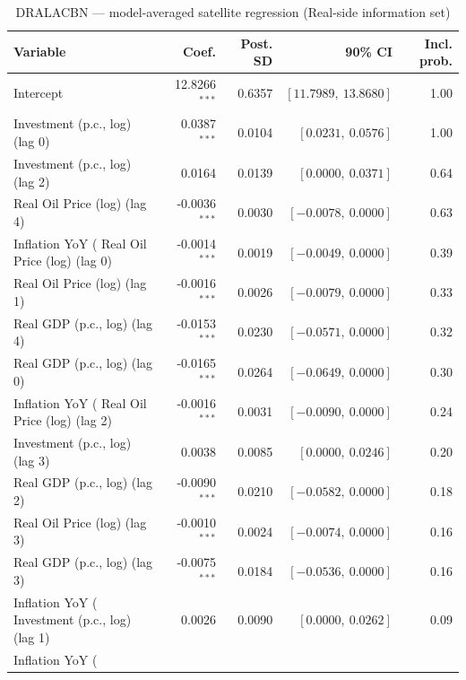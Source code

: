 \begin{table}[!htbp]
\centering
\caption{DRALACBN --- model-averaged satellite regression (Real-side information set)}
\label{tab:dralacbn_real_side_bma_satellite}
\begin{tabular}{lrrrr}
\toprule
Variable & Coef. & Post. SD & 90\% CI & Incl. prob. \\
\midrule
Intercept & 12.8266$^{***}$ & 0.6357 & $[11.7989,\ 13.8680]$ & 1.00 \\
Investment (p.c., log) (lag 0) & 0.0387$^{***}$ & 0.0104 & $[0.0231,\ 0.0576]$ & 1.00 \\
Investment (p.c., log) (lag 2) & 0.0164 & 0.0139 & $[0.0000,\ 0.0371]$ & 0.64 \\
Real Oil Price (log) (lag 4) & -0.0036$^{***}$ & 0.0030 & $[-0.0078,\ 0.0000]$ & 0.63 \\
Inflation YoY (%
Real Oil Price (log) (lag 0) & -0.0014$^{***}$ & 0.0019 & $[-0.0049,\ 0.0000]$ & 0.39 \\
Real Oil Price (log) (lag 1) & -0.0016$^{***}$ & 0.0026 & $[-0.0079,\ 0.0000]$ & 0.33 \\
Real GDP (p.c., log) (lag 4) & -0.0153$^{***}$ & 0.0230 & $[-0.0571,\ 0.0000]$ & 0.32 \\
Real GDP (p.c., log) (lag 0) & -0.0165$^{***}$ & 0.0264 & $[-0.0649,\ 0.0000]$ & 0.30 \\
Inflation YoY (%
Real Oil Price (log) (lag 2) & -0.0016$^{***}$ & 0.0031 & $[-0.0090,\ 0.0000]$ & 0.24 \\
Investment (p.c., log) (lag 3) & 0.0038 & 0.0085 & $[0.0000,\ 0.0246]$ & 0.20 \\
Real GDP (p.c., log) (lag 2) & -0.0090$^{***}$ & 0.0210 & $[-0.0582,\ 0.0000]$ & 0.18 \\
Real Oil Price (log) (lag 3) & -0.0010$^{***}$ & 0.0024 & $[-0.0074,\ 0.0000]$ & 0.16 \\
Real GDP (p.c., log) (lag 3) & -0.0075$^{***}$ & 0.0184 & $[-0.0536,\ 0.0000]$ & 0.16 \\
Inflation YoY (%
Investment (p.c., log) (lag 1) & 0.0026 & 0.0090 & $[0.0000,\ 0.0262]$ & 0.09 \\
Inflation YoY (%

\end{tabular}
\end{table}
